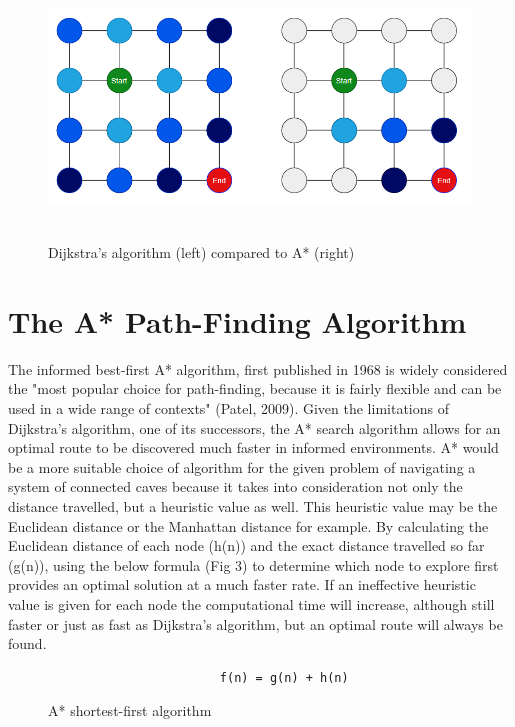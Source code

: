 \documentclass[12pt, a4paper]{article}
\begin{document}
    \begin{figure}[!htb]
    \centering
    \includegraphics[height=7cm]{DvsA.png}
    \caption{Dijkstra's algorithm (left) compared to A* (right)} \label{fig2}
    \end{figure}


\section{The A* Path-Finding Algorithm}
The informed best-first A* algorithm, first published in 1968 is widely considered the "most popular choice for path-finding, because it is fairly flexible and can be used in a wide range of contexts" (Patel, 2009)\cite{Patel}.  Given the limitations of Dijkstra's algorithm, one of its successors, the A* search algorithm allows for an optimal route to be discovered much faster in informed environments.  A* would be a more suitable choice of algorithm for the given problem of navigating a system of connected caves because it takes into consideration not only the distance travelled, but a heuristic value as well. This heuristic value may be the Euclidean distance or the Manhattan distance for example. By calculating the Euclidean distance of each node (h(n)) and the exact distance travelled so far (g(n)), using the below formula (Fig 3) to determine which node to explore first provides an optimal solution at a much faster rate. If an ineffective heuristic value is given for each node the computational time will increase, although still faster or just as fast as Dijkstra's algorithm, but an optimal route will always be found.
    
    \begin{figure}[!htb]
    \centering
    \fontsize{15pt}{15pt}\selectfont
    \begin{verbatim}
                        f(n) = g(n) + h(n)
    \end{verbatim}
    \caption{ A* shortest-first algorithm} \label{fig3}
    \end{figure}
    
\end{document}
